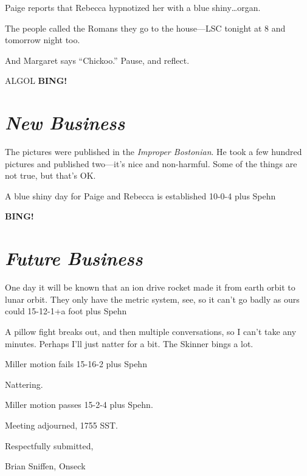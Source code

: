 \documentclass[10pt]{article}
\newcommand{\bing}{{\bf BING!} }
\newcommand{\goto}[1]{\bing \vskip 12pt \section*{{\em{#1}}}}
\newcommand{\ps}{ plus Spehn\xspace}
\begin{document}
Paige reports that Rebecca hypnotized her with a blue shiny\dots organ.

The people called the Romans they go to the house---LSC tonight at 8
and tomorrow night too.

And Margaret says ``Chickoo.''  Pause, and reflect.

ALGOL
\goto{New Business}
The pictures were published in the \emph{Improper Bostonian}.  He took
a few hundred pictures and published two---it's nice and non-harmful.
Some of the things are not true, but that's OK.

A blue shiny day for Paige and Rebecca is established 10-0-4\ps

\goto{Future Business}

One day it will be known that an ion drive rocket made it from earth
orbit to lunar orbit.  They only have the metric system, see, so it
can't go badly as ours could 15-12-1+a foot\ps

A pillow fight breaks out, and then multiple conversations, so I can't
take any minutes.  Perhaps I'll just natter for a bit.  The Skinner
bings a lot.

Miller motion fails 15-16-2\ps

Nattering.

Miller motion passes 15-2-4\ps.

\vspace{12pt}

\noindent
Meeting adjourned, 1755 SST.

\vspace{18pt}

\centerline{Respectfully submitted,}
\centerline{Brian Sniffen, Onseck}
\end{document}
